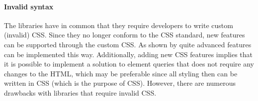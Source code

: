 \documentclass[a4paper,11pt]{kth-mag}
\begin{document}
    
    \paragraph{Invalid syntax}
    The libraries \cite{eq_imp_magichtml,eq_imp_eqcss,eq_imp_prollyfill-min-width,eq_imp_localised-css,eq_imp_gss} have in common that they require developers to write custom (invalid) \gls{CSS}.
    Since they no longer conform to the \gls{CSS} standard, new features can be supported through the custom \gls{CSS}.
    As shown by \cite{eq_imp_eqcss,eq_imp_gss} quite advanced features can be implemented this way.
    Additionally, adding new \gls{CSS} features implies that it is possible to implement a solution to element queries that does not require any changes to the \gls{HTML}, which may be preferable since all styling then can be written in \gls{CSS} (which is the purpose of \gls{CSS}).
    However, there are numerous drawbacks with libraries that require invalid \gls{CSS}.
    
\end{document}
